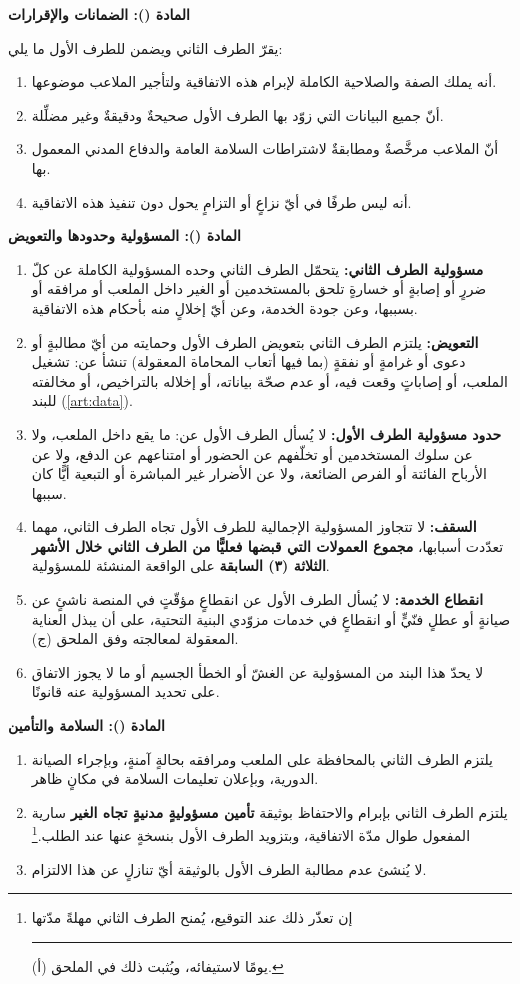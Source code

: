 \documentclass[12pt,a4paper]{article}
\newcounter{bndc}
\newcommand{\bnd}[1]{%
  \vspace{10pt}\par\noindent
  {\color{teal}\bfseries\large المادة (\arabic{bndc}): #1}%
  \stepcounter{bndc}%
  \par\vspace{2pt}\noindent{\color{rule}\rule{\linewidth}{0.6pt}}\par\vspace{4pt}%
}
\newcommand{\blank}[1][3.2cm]{\rule[-0.4ex]{#1}{0.5pt}}
\newcommand{\mlh}[1]{{\bfseries #1}}
\newenvironment{bnditems}
  {\begin{enumerate}[label=\arabic{bndc}.\arabic*,leftmargin=1.6em,itemsep=3pt,topsep=3pt]}
  {\end{enumerate}}
\begin{document}
\bnd{الضمانات والإقرارات}
يقرّ الطرف الثاني ويضمن للطرف الأول ما يلي:
\begin{bnditems}
  \item أنه يملك الصفة والصلاحية الكاملة لإبرام هذه الاتفاقية ولتأجير الملاعب موضوعها.
  \item أنّ جميع البيانات التي زوّد بها الطرف الأول صحيحةٌ ودقيقةٌ وغير مضلِّلة.
  \item أنّ الملاعب مرخَّصةٌ ومطابقةٌ لاشتراطات السلامة العامة والدفاع المدني المعمول بها.
  \item أنه ليس طرفًا في أيّ نزاعٍ أو التزامٍ يحول دون تنفيذ هذه الاتفاقية.
\end{bnditems}

\bnd{المسؤولية وحدودها والتعويض}\label{art:liab}
\begin{bnditems}
  \item \mlh{مسؤولية الطرف الثاني:} يتحمّل الطرف الثاني وحده المسؤولية الكاملة عن كلّ ضررٍ أو إصابةٍ أو خسارةٍ تلحق بالمستخدمين أو الغير داخل الملعب أو مرافقه أو بسببها، وعن جودة الخدمة، وعن أيّ إخلالٍ منه بأحكام هذه الاتفاقية.
  \item \mlh{التعويض:} يلتزم الطرف الثاني بتعويض الطرف الأول وحمايته من أيّ مطالبةٍ أو دعوى أو غرامةٍ أو نفقةٍ (بما فيها أتعاب المحاماة المعقولة) تنشأ عن: تشغيل الملعب، أو إصاباتٍ وقعت فيه، أو عدم صحّة بياناته، أو إخلاله بالتراخيص، أو مخالفته للبند (\ref{art:data}).
  \item \mlh{حدود مسؤولية الطرف الأول:} لا يُسأل الطرف الأول عن: ما يقع داخل الملعب، ولا عن سلوك المستخدمين أو تخلّفهم عن الحضور أو امتناعهم عن الدفع، ولا عن الأرباح الفائتة أو الفرص الضائعة، ولا عن الأضرار غير المباشرة أو التبعية أيًّا كان سببها.
  \item \mlh{السقف:} لا تتجاوز المسؤولية الإجمالية للطرف الأول تجاه الطرف الثاني، مهما تعدّدت أسبابها، \mlh{مجموع العمولات التي قبضها فعليًّا من الطرف الثاني خلال الأشهر الثلاثة (٣) السابقة} على الواقعة المنشئة للمسؤولية.
  \item \mlh{انقطاع الخدمة:} لا يُسأل الطرف الأول عن انقطاعٍ مؤقّتٍ في المنصة ناشئٍ عن صيانةٍ أو عطلٍ فنّيٍّ أو انقطاعٍ في خدمات مزوّدي البنية التحتية، على أن يبذل العناية المعقولة لمعالجته وفق الملحق (ج).
  \item لا يحدّ هذا البند من المسؤولية عن الغشّ أو الخطأ الجسيم أو ما لا يجوز الاتفاق على تحديد المسؤولية عنه قانونًا.
\end{bnditems}

\bnd{السلامة والتأمين}
\begin{bnditems}
  \item يلتزم الطرف الثاني بالمحافظة على الملعب ومرافقه بحالةٍ آمنةٍ، وبإجراء الصيانة الدورية، وبإعلان تعليمات السلامة في مكانٍ ظاهر.
  \item يلتزم الطرف الثاني بإبرام والاحتفاظ بوثيقة \mlh{تأمين مسؤوليةٍ مدنيةٍ تجاه الغير} سارية المفعول طوال مدّة الاتفاقية، وبتزويد الطرف الأول بنسخةٍ عنها عند الطلب.\footnote{إن تعذّر ذلك عند التوقيع، يُمنح الطرف الثاني مهلةً مدّتها \blank[1.4cm] يومًا لاستيفائه، ويُثبت ذلك في الملحق (أ).}
  \item لا يُنشئ عدم مطالبة الطرف الأول بالوثيقة أيّ تنازلٍ عن هذا الالتزام.
\end{bnditems}
\end{document}
